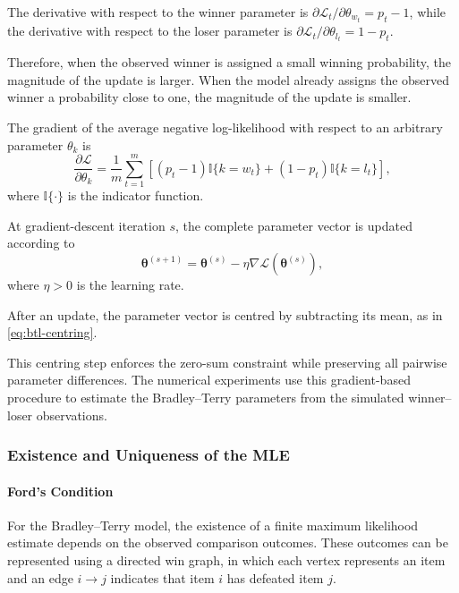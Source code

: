\documentclass[11pt,a4paper]{article}
\begin{document}
The derivative with respect to the winner parameter is $\partial\mathcal{L}_t/\partial\theta_{w_t}=p_t-1$, while the derivative with respect to the loser parameter is $\partial\mathcal{L}_t/\partial\theta_{l_t}=1-p_t$.

Therefore, when the observed winner is assigned a small winning
probability, the magnitude of the update is larger. When the model
already assigns the observed winner a probability close to one, the
magnitude of the update is smaller.

The gradient of the average negative log-likelihood with respect to an
arbitrary parameter \(\theta_k\) is
\begin{equation}
    \frac{\partial\mathcal{L}}
    {\partial\theta_k}
    =
    \frac{1}{m}
    \sum_{t=1}^{m}
    \left[
        (p_t-1)\mathbb{I}\{k=w_t\}
        +
        (1-p_t)\mathbb{I}\{k=l_t\}
    \right],
    \label{eq:btl-full-gradient}
\end{equation}
where \(\mathbb{I}\{\cdot\}\) is the indicator function.

At gradient-descent iteration \(s\), the complete parameter vector is
updated according to
\begin{equation}
    \boldsymbol{\theta}^{(s+1)}
    =
    \boldsymbol{\theta}^{(s)}
    -
    \eta
    \nabla
    \mathcal{L}
    \left(
        \boldsymbol{\theta}^{(s)}
    \right),
    \label{eq:btl-gradient-descent-update}
\end{equation}
where \(\eta>0\) is the learning rate.

After an update, the parameter vector is centred by subtracting its mean, as in \cref{eq:btl-centring}.

This centring step enforces the zero-sum constraint while preserving all
pairwise parameter differences. The numerical experiments use this
gradient-based procedure to estimate the Bradley--Terry parameters from
the simulated winner--loser observations.

\subsubsection[MLE existence and uniqueness]{Existence and Uniqueness of the MLE}
\paragraph{Ford's Condition}

For the Bradley--Terry model, the existence of a finite maximum
likelihood estimate depends on the observed comparison outcomes.
These outcomes can be represented using a directed win graph, in which
each vertex represents an item and an edge \(i\to j\) indicates that
item \(i\) has defeated item \(j\).
\end{document}
